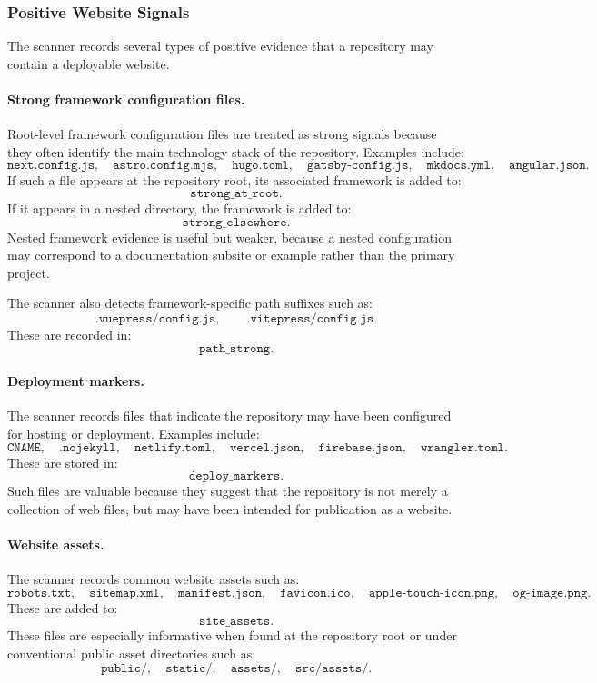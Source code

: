 \subsubsection{Positive Website Signals}

The scanner records several types of positive evidence that a repository may contain a deployable website.

\paragraph{Strong framework configuration files.}
Root-level framework configuration files are treated as strong signals because they often identify the main technology stack of the repository. Examples include:
\[
\texttt{next.config.js},\quad \texttt{astro.config.mjs},\quad \texttt{hugo.toml},\quad
\texttt{gatsby-config.js},\quad \texttt{mkdocs.yml},\quad \texttt{angular.json}.
\]
If such a file appears at the repository root, its associated framework is added to:
\[
\texttt{strong\_at\_root}.
\]
If it appears in a nested directory, the framework is added to:
\[
\texttt{strong\_elsewhere}.
\]
Nested framework evidence is useful but weaker, because a nested configuration may correspond to a documentation subsite or example rather than the primary project.

The scanner also detects framework-specific path suffixes such as:
\[
\texttt{.vuepress/config.js},\qquad \texttt{.vitepress/config.js}.
\]
These are recorded in:
\[
\texttt{path\_strong}.
\]

\paragraph{Deployment markers.}
The scanner records files that indicate the repository may have been configured for hosting or deployment. Examples include:
\[
\texttt{CNAME},\quad \texttt{.nojekyll},\quad \texttt{netlify.toml},\quad
\texttt{vercel.json},\quad \texttt{firebase.json},\quad \texttt{wrangler.toml}.
\]
These are stored in:
\[
\texttt{deploy\_markers}.
\]
Such files are valuable because they suggest that the repository is not merely a collection of web files, but may have been intended for publication as a website.

\paragraph{Website assets.}
The scanner records common website assets such as:
\[
\texttt{robots.txt},\quad \texttt{sitemap.xml},\quad \texttt{manifest.json},\quad
\texttt{favicon.ico},\quad \texttt{apple-touch-icon.png},\quad \texttt{og-image.png}.
\]
These are added to:
\[
\texttt{site\_assets}.
\]
These files are especially informative when found at the repository root or under conventional public asset directories such as:
\[
\texttt{public/},\quad \texttt{static/},\quad \texttt{assets/},\quad \texttt{src/assets/}.
\]

